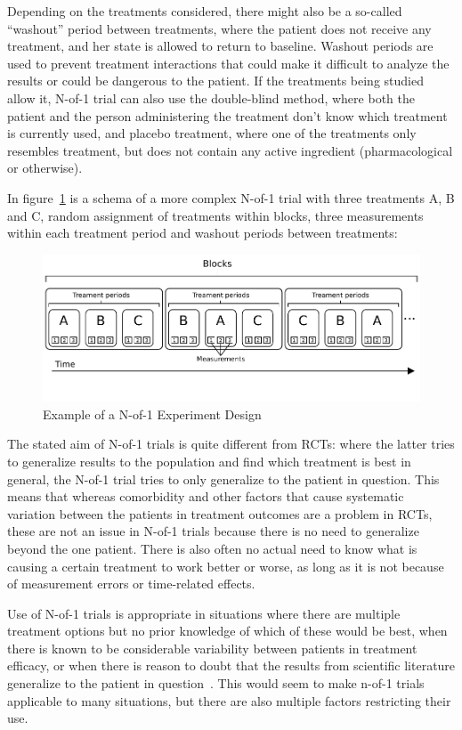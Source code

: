 \documentclass[12pt,a4paper,leqno]{report}
\theoremstyle{plain}
\theoremstyle{definition}
\theoremstyle{remark}
\begin{document}
Depending on the treatments considered, there might also be a so-called
``washout'' period between treatments, where the patient does not receive any
treatment, and her state is allowed to return to baseline. Washout periods are used to
prevent treatment interactions that could make it difficult to analyze the
results or could be dangerous to the patient. If the treatments being studied
allow it, N-of-1 trial can also use the double-blind method, where both the patient
and the person administering the treatment don't know which treatment is currently used, and placebo
treatment, where one of the treatments only resembles treatment, but does not
contain any active ingredient (pharmacological or otherwise).

In figure\ \ref{examplenof1schema} is a schema of a more complex N-of-1 trial with three treatments A, B and C,
random assignment of treatments within blocks, three measurements within each
treatment period and washout periods between treatments:

\begin{figure}[H]
    \centering
    \caption{Example of a N-of-1 Experiment Design}\label{examplenof1schema}
    \includegraphics{n-of-1_schema.pdf}
\end{figure}

The stated aim of N-of-1 trials is quite different from RCTs: where the latter
tries to generalize results to the population and find which treatment is best in
general, the N-of-1 trial tries to only generalize to the patient in question.
This means that whereas comorbidity and other factors that cause systematic
variation between the patients in treatment outcomes are a problem in RCTs,
these are not an issue in N-of-1 trials because there is no need to generalize
beyond the one patient. There is also often no actual need to know what is
causing a certain treatment to work better or worse, as long as it is not
because of measurement errors or time-related effects.

Use of N-of-1 trials is appropriate in situations where there are multiple
treatment options but no prior knowledge of which of these would be
best, when there is known to be considerable variability between patients in
treatment efficacy, or when there is reason to doubt that the results from
scientific literature generalize to the patient in question\ \cite{nofone}. This
would seem to make n-of-1 trials applicable to many situations, but there are
also multiple factors restricting their use.
\end{document}
